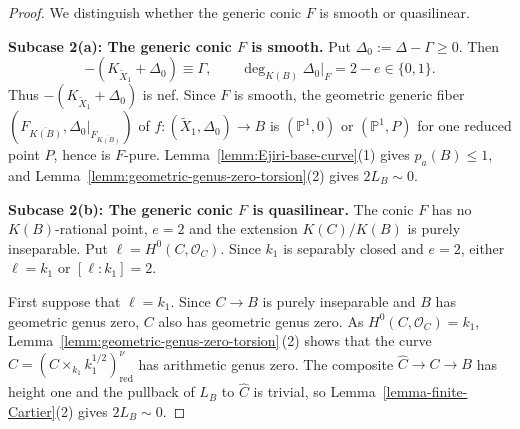 \documentclass[10pt,abstract=true]{scrartcl}
\numberwithin{equation}{section}
\theoremstyle{definition}
\theoremstyle{remark}
\begin{document}
\begin{proof}
  We distinguish whether the generic conic $F$ is smooth or quasilinear.

  \par\smallskip
  \noindent\textbf{Subcase 2(a): The generic conic $F$ is smooth.}
  Put $\Delta_0:=\Delta-\Gamma\geq0$.
  Then
  \[
    -(K_{\widetilde X_1}+\Delta_0)\equiv\Gamma,\qquad
    \deg_{K(B)}\Delta_0|_F=2-e\in\{0,1\}.
  \]
  Thus $-(K_{\widetilde X_1}+\Delta_0)$ is nef.
  Since $F$ is smooth, the geometric generic fiber $(F_{\overline{K(B)}},\Delta_0|_{F_{\overline{K(B)}}})$ of $f\colon(\widetilde X_1,\Delta_0)\to B$ is $(\mathbb P^1,0)$ or $(\mathbb P^1,P)$ for one reduced point $P$, hence is $F$-pure.
  Lemma~\ref{lemm:Ejiri-base-curve}\textup{(1)} gives $p_a(B)\leq1$, and Lemma~\ref{lemm:geometric-genus-zero-torsion}\textup{(2)} gives $2L_B\sim0$.

  \par\smallskip
  \noindent\textbf{Subcase 2(b): The generic conic $F$ is quasilinear.}
  The conic $F$ has no $K(B)$-rational point, $e=2$ and the extension $K(C)/K(B)$ is purely inseparable. 
  Put $\ell=H^0(C,\mathcal O_C)$. Since $k_1$ is separably closed and $e=2$, either $\ell=k_1$ or $[\ell:k_1]=2$.

  First suppose that $\ell=k_1$.
  Since $C\to B$ is purely inseparable and $B$ has geometric genus zero, $C$ also has geometric genus zero.
  As $H^0(C,\mathcal O_C)=k_1$, Lemma~\ref{lemm:geometric-genus-zero-torsion}\,\textup{(2)} shows that the curve $\widehat C=(C\times_{k_1}k_1^{1/2})_{\mathrm{red}}^\nu$ has arithmetic genus zero.
  The composite $\widehat C\to C\to B$ has height one and the pullback of $L_B$ to $\widehat C$ is trivial, so Lemma~\ref{lemma-finite-Cartier}\textup{(2)} gives $2L_B\sim0$.


\end{proof}
\end{document}
